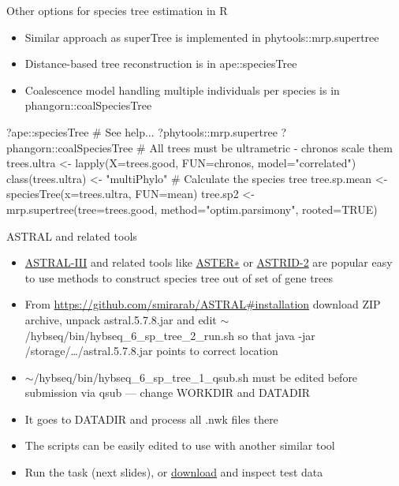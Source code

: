 \documentclass[compress,  xelatex, 11pt, xcolor=x11names, aspectratio=169,
	hyperref={
		bookmarks=true,
		unicode=true,
		colorlinks=true,
		pdftitle={HybSeq course},
		plainpages=false,
		pdfauthor={Vojtech Zeisek},
		pdfsubject={Practical processing of HybSeq target enrichment sequencing data on computing grids like MetaCentrum},
		pdfcreator={XeLaTeX},
		pdfkeywords={BASH, command line, GNU, HybSeq, Linux, MetaCentrum, sequencing shell, target enrichment},
		linkcolor=Turquoise4, %
		anchorcolor=DodgerBlue4, %
		citecolor=DodgerBlue4, %
		filecolor=DodgerBlue4, %
		menucolor=Tan4, %
		urlcolor=DarkOliveGreen4 %
		},
	url={hyphens, lowtilde} %
	]{beamer}
\renewcommand{\texttt}[1]{\colorbox{Cornsilk2}{{\ttfamily #1}}}
\renewcommand{\alert}[1]{\textcolor{OrangeRed3}{#1}}
\begin{document}
\begin{frame}[fragile]{Other options for species tree estimation in R}
	\begin{itemize}
		\item Similar approach as \texttt{superTree} is implemented in \texttt{phytools::mrp.supertree}
		\item Distance-based tree reconstruction is in \texttt{ape::speciesTree}
		\item Coalescence model handling multiple individuals per species is in \texttt{phangorn::coalSpeciesTree}
	\end{itemize}
	\begin{spluscode}
    ?ape::speciesTree # See help...
    ?phytools::mrp.supertree
    ?phangorn::coalSpeciesTree
    # All trees must be ultrametric - chronos scale them
    trees.ultra <- lapply(X=trees.good, FUN=chronos, model="correlated")
    class(trees.ultra) <- "multiPhylo"
    # Calculate the species tree
    tree.sp.mean <- speciesTree(x=trees.ultra, FUN=mean)
    tree.sp2 <- mrp.supertree(tree=trees.good, method="optim.parsimony",
      rooted=TRUE)
	\end{spluscode}
\end{frame}

\begin{frame}{ASTRAL and related tools}
	\begin{itemize}
		\item \href{https://github.com/smirarab/ASTRAL}{ASTRAL-III} and related tools like \href{https://github.com/chaoszhang/ASTER}{ASTER∗} or \href{https://github.com/pranjalv123/ASTRID}{ASTRID-2} are popular easy to use methods to construct species tree out of set of gene trees
		\item From \url{https://github.com/smirarab/ASTRAL\#installation} download \texttt{ZIP} archive, unpack \texttt{astral.5.7.8.jar} and edit \texttt{$\sim$/hybseq/bin/hybseq\_6\_sp\_tree\_2\_run.sh} so that \texttt{java -jar /storage/\ldots/astral.5.7.8.jar} points to correct location
		\item \alert{\texttt{$\sim$/hybseq/bin/hybseq\_6\_sp\_tree\_1\_qsub.sh} must be edited before submission via \texttt{qsub} --- change \texttt{WORKDIR} and \texttt{DATADIR}}
		\item It goes to \texttt{DATADIR} and process all \texttt{*.nwk} files there
		\item The scripts can be easily edited to use with another similar tool
		\item Run the task (next slides), or \href{https://botany.natur.cuni.cz/zeisek/hybseq_course_zingibers_5_sp_trees.zip}{download} and inspect test data
	\end{itemize}
\end{frame}
\end{document}

